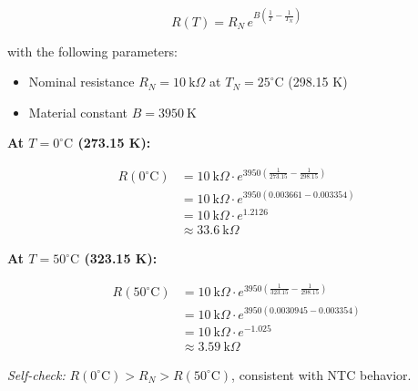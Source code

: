 \[
R(T) = R_N \, e^{B \left( \frac{1}{T} - \frac{1}{T_N} \right)}
\]

with the following parameters:

\begin{itemize}
    \item Nominal resistance $R_N = 10~\text{k}\Omega$ at $T_N = 25^\circ\text{C}$ (298.15 K)
    \item Material constant $B = 3950~\text{K}$
\end{itemize}



\begin{solutionblock}
\textbf{At $T = 0^\circ\text{C}$ (273.15 K):}

\[
\begin{aligned}
R(0^\circ\text{C}) &= 10~\text{k}\Omega \cdot e^{3950 \left(\frac{1}{273.15} - \frac{1}{298.15}\right)} \\
&= 10~\text{k}\Omega \cdot e^{3950 (0.003661 - 0.003354)} \\
&= 10~\text{k}\Omega \cdot e^{1.2126} \\
&\approx 33.6~\text{k}\Omega
\end{aligned}
\]

\textbf{At $T = 50^\circ\text{C}$ (323.15 K):}

\[
\begin{aligned}
R(50^\circ\text{C}) &= 10~\text{k}\Omega \cdot e^{3950 \left(\frac{1}{323.15} - \frac{1}{298.15}\right)} \\
&= 10~\text{k}\Omega \cdot e^{3950 (0.0030945 - 0.003354)} \\
&= 10~\text{k}\Omega \cdot e^{-1.025} \\
&\approx 3.59~\text{k}\Omega
\end{aligned}
\]

\textit{Self-check:} $R(0^\circ\text{C}) > R_N > R(50^\circ\text{C})$, consistent with NTC behavior.
\end{solutionblock}




